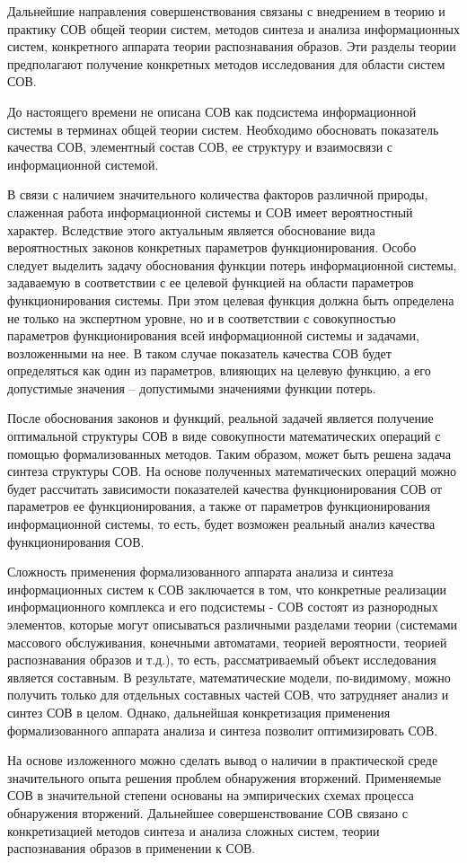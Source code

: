 Дальнейшие направления совершенствования связаны с внедрением в теорию и практику СОВ
общей теории систем, методов синтеза и анализа информационных систем, конкретного аппарата
теории распознавания образов. Эти разделы теории предполагают получение конкретных методов
исследования для области систем СОВ.

До настоящего времени не описана СОВ как подсистема информационной системы в терминах
общей теории систем. Необходимо обосновать показатель качества СОВ, элементный состав
СОВ, ее структуру и взаимосвязи с информационной системой.

В связи с наличием значительного количества факторов различной природы, слаженная работа
информационной системы и СОВ имеет вероятностный характер. Вследствие этого актуальным
является обоснование вида вероятностных законов конкретных параметров функционирования.
Особо следует выделить задачу обоснования функции потерь информационной системы, задаваемую
в соответствии с ее целевой функцией на области параметров функционирования системы.
При этом целевая функция должна быть определена не только на экспертном уровне, но и в
соответствии с совокупностью параметров функционирования всей информационной системы и
задачами, возложенными на нее. В таком случае показатель качества СОВ будет определяться
как один из параметров, влияющих на целевую функцию, а его допустимые значения --
допустимыми значениями функции потерь.

После обоснования законов и функций, реальной задачей является получение оптимальной
структуры СОВ в виде совокупности математических операций с помощью формализованных
методов. Таким образом, может быть решена задача синтеза структуры СОВ. На основе
полученных математических операций можно будет рассчитать зависимости показателей
качества функционирования СОВ от параметров ее функционирования, а также от параметров
функционирования информационной системы, то есть, будет возможен реальный анализ качества
функционирования СОВ.

Сложность применения формализованного аппарата анализа и синтеза информационных систем
к СОВ заключается в том, что конкретные реализации информационного комплекса и его
подсистемы - СОВ состоят из разнородных элементов, которые могут описываться различными
разделами теории (системами массового обслуживания, конечными автоматами, теорией
вероятности, теорией распознавания образов и т.д.), то есть, рассматриваемый объект
исследования является составным. В результате, математические модели, по-видимому,
можно получить только для отдельных составных частей СОВ, что затрудняет анализ и
синтез СОВ в целом. Однако, дальнейшая конкретизация применения формализованного
аппарата анализа и синтеза позволит оптимизировать СОВ.

На основе изложенного можно сделать вывод о наличии в практической среде значительного опыта
решения проблем обнаружения вторжений. Применяемые СОВ в значительной степени основаны на
эмпирических схемах процесса обнаружения вторжений. Дальнейшее совершенствование СОВ связано
с конкретизацией методов синтеза и анализа сложных систем, теории распознавания образов в
применении к СОВ.
